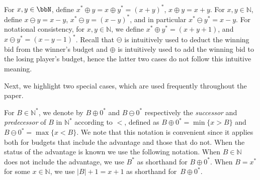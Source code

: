 \documentclass{article}\providecommand{\nequiv}{\not\equiv}\usepackage[a4paper,margin=20mm]{geometry}
\newcommand{\Nat}{\mathbb{N}}
\renewcommand{\set}[1]{\{ #1  \}}
\newcommand{\succb}[1]{#1 \oplus 0^*\xspace}
\newcommand{\predb}[1]{#1 \ominus 0^*\xspace}
\begin{document}
  \begin{definition}
    For \(x, y \in \bbN\), define $x^* \oplus y = x \oplus y^* = (x + y)^*$, $x \oplus y = x+y$. For $x,y \in \Nat$, define \(x \ominus y = x-y\), \(x^* \ominus y = (x-y)^*\), and in particular $x^* \ominus y^* = x-y$.
	For notational consistency, for \(x, y \in \Nat\), we define \(x^* \oplus y^* = (x+y+1)\), and \(x \ominus y^* = (x - y - 1)^*\). 
	Recall that $\ominus$ is intuitively used to deduct the winning bid from the winner's budget and \(\oplus\) is intuitively used to add the winning bid to the losing player's budget,
	hence the latter two cases do not follow this intuitive meaning.
\end{definition}

Next, we highlight two special cases, which are used frequently throughout the paper. 


\begin{definition}
For $B \in \Nat^*$, we denote by $\succb{B}$ and $\predb{B}$ respectively the {\em successor} and {\em predecessor} of $B$ in $\Nat^*$ according to $<$, defined as $\succb{B} = \min \set{x > B}$ and $\predb{B} = \max \set{x < B}$.
We note that this notation is convenient since it applies both for budgets that include the advantage and those that do not. When the status of the advantage is known we use the following notation. When \(B \in \Nat\) does not include the advantage, we use \(B^*\) as shorthand for \(\succb{B}\). 
When \(B = x^*\) for some \(x \in \Nat\), we use \(|B|+1 = x+ 1\) as shorthand for~\(\succb{B}\). 
\end{definition}
\end{document}
